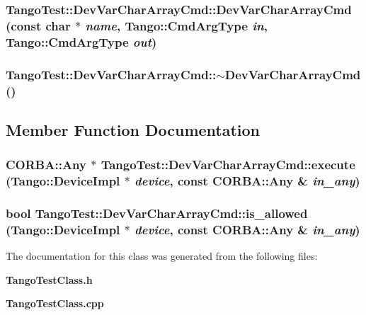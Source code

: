 \subsubsection{\setlength{\rightskip}{0pt plus 5cm}Tango\-Test::Dev\-Var\-Char\-Array\-Cmd::Dev\-Var\-Char\-Array\-Cmd (const char $\ast$ {\em name}, Tango::Cmd\-Arg\-Type {\em in}, Tango::Cmd\-Arg\-Type {\em out})}\label{classTangoTest_1_1DevVarCharArrayCmd_a1}


\subsubsection{\setlength{\rightskip}{0pt plus 5cm}Tango\-Test::Dev\-Var\-Char\-Array\-Cmd::$\sim$Dev\-Var\-Char\-Array\-Cmd ()\hspace{0.3cm}{\tt  [inline]}}\label{classTangoTest_1_1DevVarCharArrayCmd_a2}




\subsection{Member Function Documentation}
\subsubsection{\setlength{\rightskip}{0pt plus 5cm}CORBA::Any $\ast$ Tango\-Test::Dev\-Var\-Char\-Array\-Cmd::execute (Tango::Device\-Impl $\ast$ {\em device}, const CORBA::Any \& {\em in\_\-any})\hspace{0.3cm}{\tt  [virtual]}}\label{classTangoTest_1_1DevVarCharArrayCmd_a4}


\subsubsection{\setlength{\rightskip}{0pt plus 5cm}bool Tango\-Test::Dev\-Var\-Char\-Array\-Cmd::is\_\-allowed (Tango::Device\-Impl $\ast$ {\em device}, const CORBA::Any \& {\em in\_\-any})\hspace{0.3cm}{\tt  [virtual]}}\label{classTangoTest_1_1DevVarCharArrayCmd_a3}




The documentation for this class was generated from the following files:\begin{CompactItemize}
\item 
{\bf Tango\-Test\-Class.h}\item 
{\bf Tango\-Test\-Class.cpp}\end{CompactItemize}
